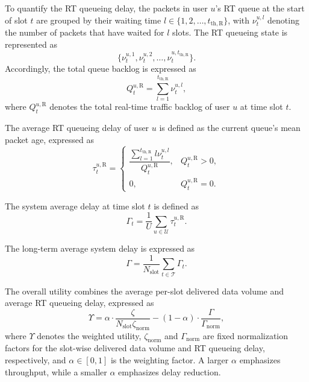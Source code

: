 \documentclass[journal]{IEEEtran}
\begin{document}
To quantify the RT queueing delay, the packets in user $u$'s RT queue at the start of slot $t$ are grouped by their waiting time $l\in\{1,2,\ldots,t_{\mathrm{th},\mathrm{R}}\}$, with $\nu_t^{u,l}$ denoting the number of packets that have waited for $l$ slots. The RT queueing state is represented as
\begin{equation}
\{\nu_t^{u,1},\nu_t^{u,2},\ldots,\nu_t^{u,t_{\mathrm{th},\mathrm{R}}}\}.
\end{equation}
Accordingly, the total queue backlog is expressed as
\begin{equation}
Q_t^{u,\mathrm{R}}=
\sum_{l=1}^{t_{\mathrm{th},\mathrm{R}}}\nu_t^{u,l},
\end{equation}
where $Q_t^{u,\mathrm{R}}$ denotes the total real-time traffic backlog of user $u$ at time slot $t$.

The average RT queueing delay of user $u$ is defined as the current queue's mean packet age, expressed as
\begin{equation}
\tau_t^{u,\mathrm{R}}=
\begin{cases}
\dfrac{\sum_{l=1}^{t_{\mathrm{th},\mathrm{R}}}l\nu_t^{u,l}}{Q_t^{u,\mathrm{R}}}, & Q_t^{u,\mathrm{R}}>0,\\
0, & Q_t^{u,\mathrm{R}}=0.
\end{cases}
\label{eq:rt-queue-age}
\end{equation}

The system average delay at time slot $t$ is defined as
\begin{equation}
\Gamma_t=
\frac{1}{U}
\sum_{u\in\mathcal{U}}\tau_t^{u,\mathrm{R}}.
\label{eq:system-queue-age}
\end{equation}

The long-term average system delay is expressed as
\begin{equation}
\Gamma=
\frac{1}{N_{\mathrm{slot}}}
\sum_{t\in\mathcal{T}}\Gamma_t.
\label{eq:long-term-queue-age}
\end{equation}

The overall utility combines the average per-slot delivered data volume and average RT queueing delay, expressed as
\begin{equation}
\label{eq:p2-utility}
\Upsilon=
\alpha\cdot\frac{\zeta}{N_{\mathrm{slot}}\zeta_{\mathrm{norm}}}
-
(1-\alpha)\cdot\frac{\Gamma}{\Gamma_{\mathrm{norm}}},
\end{equation}
where $\Upsilon$ denotes the weighted utility, $\zeta_{\mathrm{norm}}$ and $\Gamma_{\mathrm{norm}}$ are fixed normalization factors for the slot-wise delivered data volume and RT queueing delay, respectively, and $\alpha\in[0,1]$ is the weighting factor. A larger $\alpha$ emphasizes throughput, while a smaller $\alpha$ emphasizes delay reduction.
\end{document}
